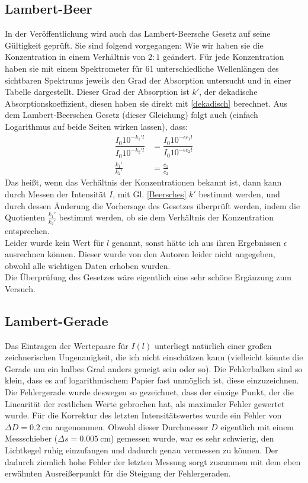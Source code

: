 \subsection{Lambert-Beer}
In der Veröffentlichung wird auch das Lambert-Beersche Gesetz auf seine Gültigkeit geprüft. Sie sind folgend vorgegangen: Wie wir haben sie die Konzentration in einem Verhältnis von \(2:1\) geändert. Für jede Konzentration haben sie mit einem Spektrometer für 61 unterschiedliche Wellenlängen des sichtbaren Spektrums jeweils den Grad der Absorption untersucht und in einer Tabelle dargestellt. Dieser Grad der Absorption ist \(k'\), der dekadische Absorptionskoeffizient, diesen haben sie direkt mit \cref{dekadisch} berechnet. Aus dem Lambert-Beerschen Gesetz (dieser Gleichung) folgt auch (einfach Logarithmus auf beide Seiten wirken lassen), dass:
\begin{equation}
  \begin{aligned}
  \dfrac{I_0 10^{-k_1' l}}{I_0 10^{-k_2' l}} &= \dfrac{I_0 10^{-\epsilon c_1 l}}{I_0 10^{-\epsilon c_2 l}} \\ 
  \frac{k_1'}{k_2'} &= \frac{c_1}{c_2}
  \end{aligned}
\end{equation}
Das heißt, wenn das Verhältnis der Konzentrationen bekannt ist, dann kann durch Messen der Intensität \(I\), mit Gl. \cref{Beersches} \(k'\) bestimmt werden, und durch dessen Änderung die Vorhersage des Gesetzes überprüft werden, indem die Quotienten \(\frac{k_1'}{k_2'}\) bestimmt werden, ob sie dem Verhältnis der Konzentration entsprechen.\\
Leider wurde kein Wert für \(l\) genannt, sonst hätte ich aus ihren Ergebnissen \(\epsilon\) ausrechnen können. Dieser wurde von den Autoren leider nicht angegeben, obwohl alle wichtigen Daten erhoben wurden.\\
Die Überprüfung des Gesetzes wäre eigentlich eine sehr schöne Ergänzung zum Versuch. 

\subsection{Lambert-Gerade}
Das Eintragen der Wertepaare für \(I(l)\) unterliegt natürlich einer großen zeichnerischen Ungenauigkeit, die ich nicht einschätzen kann (vielleicht könnte die Gerade um ein halbes Grad anders geneigt sein oder so). Die Fehlerbalken sind so klein, dass es auf logarithmischem Papier fast unmöglich ist, diese einzuzeichnen. Die Fehlergerade wurde deswegen so gezeichnet, dass der einzige Punkt, der die Linearität der restlichen Werte gebrochen hat, als maximaler Fehler gewertet wurde. Für die Korrektur des letzten Intensitätswertes wurde ein Fehler von \(\Delta D = \qty{0,2}{\cm}\) angenommen. Obwohl dieser Durchmesser \(D\) eigentlich mit einem Messschieber (\(\Delta s = \qty{0,005}{\cm}\)) gemessen wurde, war es sehr schwierig, den Lichtkegel ruhig einzufangen und dadurch genau vermessen zu können. Der dadurch ziemlich hohe Fehler der letzten Messung sorgt zusammen mit dem eben erwähnten Ausreißerpunkt für die Steigung der Fehlergeraden.

